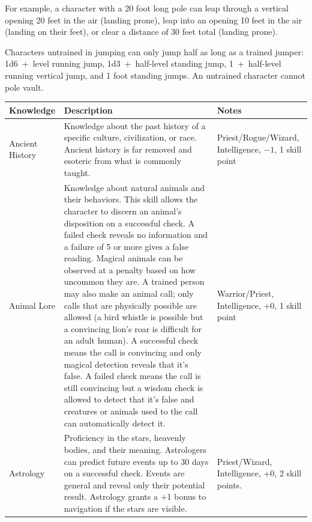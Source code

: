 \begin{multicols}{2}
For example, a character with a 20 foot long pole can leap through a vertical opening 20 feet in the air (landing prone), leap into an opening 10 feet in the air (landing on their feet), or clear a distance of 30 feet total (landing prone).

Characters untrained in jumping can only jump half as long as a trained jumper: 1d6~+~level running jump, 1d3~+~half-level standing jump, 1~+~half-level running vertical jump, and 1 foot standing jumps.  An untrained character cannot pole vault.

\end{multicols}

\noindent
\begin{minipage}{\columnwidth}

\label{knowledgeskills}
\noindent
\begin{tabular}{|p{}|p{}|p{}|}
\hline
Knowledge	& Description	& Notes \\
\hline\hline
\rowcolor[gray]{.9}Ancient History		& Knowledge about the past history of a specific culture, civilization, or race.  Ancient history is far removed and esoteric from what is commonly taught.	& Priest/Rogue/Wizard, Intelligence, $-1$, 1 skill point \\
Animal Lore	& Knowledge about natural animals and their behaviors.  This skill allows the character to discern an animal's disposition on a successful check.  A failed check reveals no information and a failure of 5 or more gives a false reading.  Magical animals can be observed at a penalty based on how uncommon they are.  A trained person may also make an animal call; only calls that are physically possible are allowed (a bird whistle is possible but a convincing lion's roar is difficult for an adult human).  A successful check means the call is convincing and only magical detection reveals that it's false.  A failed check means the call is still convincing but a wisdom check is allowed to detect that it's false and creatures or animals used to the call can automatically detect it.	& Warrior/Priest, Intelligence, +0, 1 skill point \\
\rowcolor[gray]{.9}Astrology	& Proficiency in the stars, heavenly bodies, and their meaning.  Astrologers can predict future events up to 30 days on a successful check.  Events are general and reveal only their potential result.  Astrology grants a +1 bonus to navigation if the stars are visible.	& Priest/Wizard, Intelligence, +0, 2 skill points. \\

\end{tabular}
\end{minipage}
